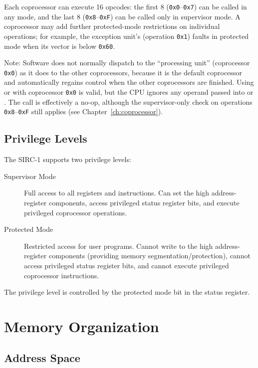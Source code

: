 Each coprocessor can execute 16 opcodes: the first 8 (\texttt{0x0}--\texttt{0x7}) can be called in any mode, and the
last 8 (\texttt{0x8}--\texttt{0xF}) can be called only in supervisor mode. A coprocessor may add further protected-mode
restrictions on individual operations; for example, the exception unit's  (operation \texttt{0x1})
faults in protected mode when its vector is below \texttt{0x60}.

Note: Software does not normally dispatch to the ``processing unit'' (coprocessor \texttt{0x0}) as it does to the other
coprocessors, because it is the default coprocessor and automatically regains control when the other coprocessors are
finished. Using  or  with coprocessor \texttt{0x0} is valid, but the CPU ignores any
operand passed into  or . The call is effectively a no-op, although the supervisor-only
check on operations \texttt{0x8}--\texttt{0xF} still applies (see Chapter~\ref{ch:coprocessor}).

\subsection{Privilege Levels}

The SIRC-1 supports two privilege levels:

\begin{description}
	\item[Supervisor Mode] Full access to all registers and instructions. Can set the high address-register components, access
	      privileged status register bits, and execute privileged coprocessor operations.

	\item[Protected Mode] Restricted access for user programs. Cannot write to the high address-register components (providing
	      memory segmentation/protection), cannot access privileged status register bits, and cannot execute privileged
	      coprocessor instructions.
\end{description}

The privilege level is controlled by the protected mode bit in the status register.

\section{Memory Organization}

\subsection{Address Space}

